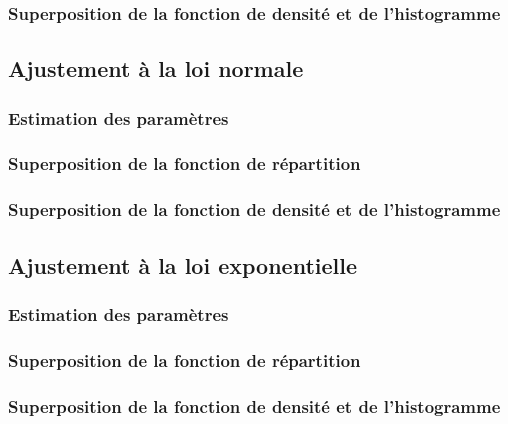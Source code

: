 \documentclass{article}
\begin{document}
\subsubsection{Superposition de la fonction de densité et de l'histogramme}

\subsection{Ajustement à la loi normale}

\subsubsection{Estimation des paramètres}
\subsubsection{Superposition de la fonction de répartition}
\subsubsection{Superposition de la fonction de densité et de l'histogramme}

\subsection {Ajustement à la loi exponentielle}

\subsubsection{Estimation des paramètres}
\subsubsection{Superposition de la fonction de répartition}
\subsubsection{Superposition de la fonction de densité et de l'histogramme}

\newpage
\appendix

\section{}

\subsection{}

\subsubsection{}

\begin{verbatim}
\end{verbatim}
\end{document}
